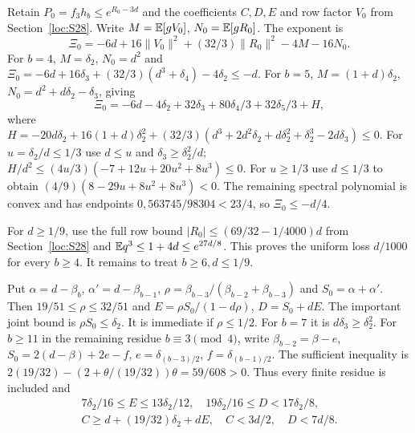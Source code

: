 Retain $P_0=f_3h_b\le e^{R_0-3d}$ and the coefficients $C,D,E$
and row factor $V_0$ from Section~\ref{loc:S28}.
Write $M=\mathbb E[gV_0]$, $N_0=\mathbb E[gR_0]$.
The exponent is
\[
 \Xi_0=-6d+16\|V_0\|^2+(32/3)\|R_0\|^2-4M-16N_0.
\]
For $b=4$, $M=\delta_{2}$, $N_0=d^2$ and
$\Xi_0=-6d+16\delta_{3}+(32/3)(d^3+\delta_{4})-4\delta_{2}\le-d$.
For $b=5$, $M=(1+d)\delta_{2}$, $N_0=d^2+d\delta_{2}-\delta_{3}$, giving
\[
 \Xi_0=-6d-4\delta_{2}+32\delta_{3}+80\delta_{4}/3+32\delta_{5}/3+H,
\]
where $H=-20d\delta_{2}+16(1+d)\delta_{2}^2+
(32/3)(d^3+2d^2\delta_{2}+d\delta_{2}^2+\delta_{2}^3-2d\delta_{3})\le0$.
For $u=\delta_{2}/d\le1/3$ use $d\le u$ and $\delta_{3}\ge \delta_{2}^2/d$;
$H/d^2\le(4u/3)(-7+12u+20u^2+8u^3)\le0$.
For $u\ge1/3$ use $d\le1/3$ to obtain
$(4/9)(8-29u+8u^2+8u^3)<0$.
The remaining spectral polynomial is convex and has endpoints
$0,563745/98304<23/4$, so $\Xi_0\le-d/4$.

For $d\ge1/9$, use the full row bound
$|R_0|\le(69/32-1/4000)d$ from Section~\ref{loc:S28} and
$\mathbb E q^3\le1+4d\le e^{27d/8}$.
This proves the uniform loss $d/1000$ for every $b\ge4$.
It remains to treat $b\ge6,d\le1/9$.

Put $\alpha=d-\beta_b$, $\alpha'=d-\beta_{b-1}$,
$\rho=\beta_{b-3}/(\beta_{b-2}+\beta_{b-3})$ and $S_0=\alpha+\alpha'$.
Then $19/51\le\rho\le32/51$ and
$E=\rho S_0/(1-d\rho)$, $D=S_0+dE$.
The important joint bound is $\rho S_0\le \delta_{2}$.
It is immediate if $\rho\le1/2$.
For $b=7$ it is $d\delta_{3}\ge \delta_{2}^2$.
For $b\ge11$ in the remaining residue $b\equiv3\pmod4$, write
$\beta_{b-2}=\beta-e$, $S_0=2(d-\beta)+2e-f$,
$e=\delta_{(b-3)/2}$, $f=\delta_{(b-1)/2}$.
The sufficient inequality is
$2(19/32)-(2+\theta/(19/32))\theta=59/608>0$.
Thus every finite residue is included and
\begin{gather*}
 7\delta_{2}/16\le E\le13\delta_{2}/12,\quad19\delta_{2}/16\le D<17\delta_{2}/8,\\
 C\ge d+(19/32)\delta_{2}+dE,\quad C<3d/2,\quad D<7d/8.
\end{gather*}

